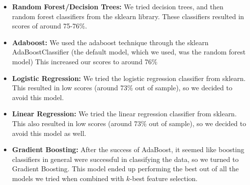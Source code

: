 \begin{itemize}
\begin{itemize}
    \item \textbf{Random Forest/Decision Trees:} We tried decision trees, and then random forest classifiers from  the sklearn library. These classifiers resulted in scores of around 75-76\%.
    \item \textbf{Adaboost:} We used the adaboost technique through the sklearn AdaBoostClassifier (the default model, which we used, was the random forest model) This increased our scores to around 76\%
    \item \textbf{Logistic Regression:} We tried the logistic regression classifier from sklearn. This resulted in low scores (around 73\% out of sample), so we decided to avoid this model.
    \item \textbf{Linear Regression:} We tried the linear regression classifier from sklearn. This also resulted in low scores (around 73\% out of sample), so we decided to avoid this model as well.
    \item \textbf{Gradient Boosting:} After the success of AdaBoost, it seemed like boosting classifiers in general were successful in classifying the data, so we turned to Gradient Boosting. This model ended up performing the best out of all the models we tried when combined with $k$-best feature selection. 
   


    \end{itemize}


\end{itemize}
